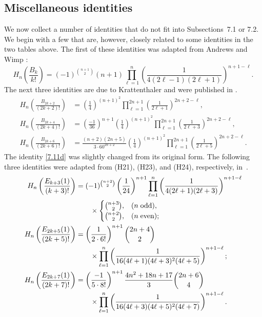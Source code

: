 \documentclass{amsart}
\theoremstyle{plain}
\numberwithin{equation}{section}
\begin{document}
\subsection{Miscellaneous identities}

We now collect a number of identities that do not fit into Subsections~7.1 or 
7.2. We begin with a few that are, however, closely related to some identities
in the two tables above. The first of these identities was adapted from 
Andrews and Wimp \cite[p.~441]{AW}:
\begin{equation}\label{7.11a}
H_n\left(\frac{B_{k}}{k!}\right) = (-1)^{\binom{n+1}{2}}(n+1)
\prod_{\ell=1}^n\left(\frac{1}{4(2\ell-1)(2\ell+1)}\right)^{n+1-\ell}.
\end{equation}
The next three identities are due to Krattenthaler and were published in 
\cite[p.~346]{FY}.
\begin{align}
H_n\left(\frac{B_{2k+2}}{(2k+2)!}\right) &= \left(\frac{1}{4}\right)^{(n+1)^2}
\prod_{\ell=1}^{2n+1}\left(\frac{1}{2\ell+1}\right)^{2n+2-\ell},\label{7.11b}\\
H_n\left(\frac{B_{2k+4}}{(2k+4)!}\right) &= \left(\frac{-1}{36}\right)^{n+1}
\left(\frac{1}{4}\right)^{(n+1)^2}
\prod_{\ell=1}^{2n+1}\left(\frac{1}{2\ell+3}\right)^{2n+2-\ell},\label{7.11c}\\
H_n\left(\frac{B_{2k+6}}{(2k+6)!}\right) &= \frac{(n+2)(2n+5)}{3\cdot 60^{2n+2}}
\left(\frac{1}{4}\right)^{(n+1)^2}
\prod_{\ell=1}^{2n+1}\left(\frac{1}{2\ell+5}\right)^{2n+2-\ell}.\label{7.11d}
\end{align}
The identity \eqref{7.11d} was slightly changed from its original form. The
following three identities were adapted from (H21), (H23), and (H24), 
respectively, in~\cite{Ha}.
\begin{align}
H_n\left(\frac{E_{k+3}(1)}{(k+3)!}\right)
&= (-1)^{\binom{n+2}{2}}\left(\frac{1}{24}\right)^{n+1}\prod_{\ell=1}^n
\left(\frac{1}{4(2\ell+1)(2\ell+3)}\right)^{n+1-\ell}\label{7.11}\\
&\qquad\times\begin{cases}
\binom{n+3}{2},& (n\;\hbox{odd}),\\
\binom{n+2}{2},& (n\;\hbox{even});
\end{cases}\nonumber \\
H_n\left(\frac{E_{2k+5}(1)}{(2k+5)!}\right)
&= \left(\frac{1}{2\cdot 6!}\right)^{n+1}\binom{2n+4}{2}\label{7.12}\\
&\qquad\times\prod_{\ell=1}^n
\left(\frac{1}{16(4\ell+1)(4\ell+3)^2(4\ell+5)}\right)^{n+1-\ell};\nonumber\\
H_n\left(\frac{E_{2k+7}(1)}{(2k+7)!}\right)
&= \left(\frac{-1}{5\cdot 8!}\right)^{n+1}\frac{4n^2+18n+17}{3}\binom{2n+6}{4}\label{7.13}\\
&\qquad\times\prod_{\ell=1}^n
\left(\frac{1}{16(4\ell+3)(4\ell+5)^2(4\ell+7)}\right)^{n+1-\ell}.\nonumber
\end{align}
\end{document}
